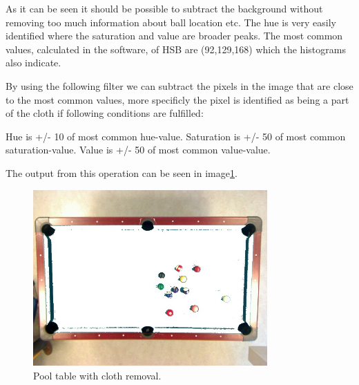 As it can be seen it should be possible to subtract the background without removing too much information about ball location etc. The hue is very easily identified where the saturation and value are broader peaks.
The most common values, calculated in the software, of HSB are (92,129,168) which the histograms also indicate.

By using the following filter we can subtract the pixels in the image that are close to the most common values, more specificly the pixel is identified as being a part of the cloth if following conditions are fulfilled:

Hue is +/- 10 of most common hue-value.
Saturation is +/- 50 of most common saturation-value.
Value is +/- 50 of most common value-value.

The output from this operation can be seen in image\ref{fig:poolclothremoval}.

\begin{figure}[htpb]
\begin{center}
\leavevmode
\includegraphics[width=0.8\textwidth]{images/table-remove-cloth.jpg}
\end{center}
\caption{Pool table with cloth removal.}
\label{fig:poolclothremoval}
\end{figure}



